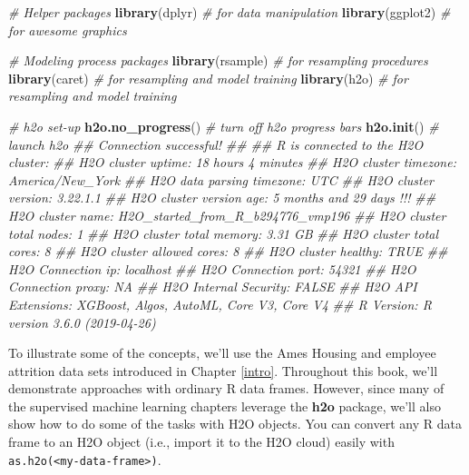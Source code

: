 \documentclass[]{krantz}
\makeatletter
\newenvironment{Shaded}{\begin{snugshade}}{\end{snugshade}}
\newcommand{\CommentTok}[1]{\textcolor[rgb]{0.37,0.37,0.37}{\textit{#1}}}
\newcommand{\KeywordTok}[1]{\textcolor[rgb]{0.27,0.27,0.27}{\textbf{#1}}}
\newcommand{\NormalTok}[1]{#1}
\newenvironment{kframe}{%
\medskip{}
\setlength{\fboxsep}{.8em}
 \def\at@end@of@kframe{}%
 \ifinner\ifhmode%
  \def\at@end@of@kframe{\end{minipage}}%
  \begin{minipage}{\columnwidth}%
 \fi\fi%
 \def\FrameCommand##1{\hskip\@totalleftmargin \hskip-\fboxsep
 \colorbox{shadecolor}{##1}\hskip-\fboxsep
     \hskip-\linewidth \hskip-\@totalleftmargin \hskip\columnwidth}%
 \MakeFramed {\advance\hsize-\width
   \@totalleftmargin\z@ \linewidth\hsize
   \@setminipage}}%
 {\par\unskip\endMakeFramed%
 \at@end@of@kframe}
\renewenvironment{Shaded}{\begin{kframe}}{\end{kframe}}
\makeatother
\begin{document}
\begin{Shaded}
\begin{Highlighting}[]
\CommentTok{# Helper packages}
\KeywordTok{library}\NormalTok{(dplyr)     }\CommentTok{# for data manipulation}
\KeywordTok{library}\NormalTok{(ggplot2)   }\CommentTok{# for awesome graphics}

\CommentTok{# Modeling process packages}
\KeywordTok{library}\NormalTok{(rsample)   }\CommentTok{# for resampling procedures}
\KeywordTok{library}\NormalTok{(caret)     }\CommentTok{# for resampling and model training}
\KeywordTok{library}\NormalTok{(h2o)       }\CommentTok{# for resampling and model training}

\CommentTok{# h2o set-up }
\KeywordTok{h2o.no_progress}\NormalTok{()  }\CommentTok{# turn off h2o progress bars}
\KeywordTok{h2o.init}\NormalTok{()         }\CommentTok{# launch h2o}
\CommentTok{##  Connection successful!}
\CommentTok{## }
\CommentTok{## R is connected to the H2O cluster: }
\CommentTok{##     H2O cluster uptime:         18 hours 4 minutes }
\CommentTok{##     H2O cluster timezone:       America/New_York }
\CommentTok{##     H2O data parsing timezone:  UTC }
\CommentTok{##     H2O cluster version:        3.22.1.1 }
\CommentTok{##     H2O cluster version age:    5 months and 29 days !!! }
\CommentTok{##     H2O cluster name:           H2O_started_from_R_b294776_vmp196 }
\CommentTok{##     H2O cluster total nodes:    1 }
\CommentTok{##     H2O cluster total memory:   3.31 GB }
\CommentTok{##     H2O cluster total cores:    8 }
\CommentTok{##     H2O cluster allowed cores:  8 }
\CommentTok{##     H2O cluster healthy:        TRUE }
\CommentTok{##     H2O Connection ip:          localhost }
\CommentTok{##     H2O Connection port:        54321 }
\CommentTok{##     H2O Connection proxy:       NA }
\CommentTok{##     H2O Internal Security:      FALSE }
\CommentTok{##     H2O API Extensions:         XGBoost, Algos, AutoML, Core V3, Core V4 }
\CommentTok{##     R Version:                  R version 3.6.0 (2019-04-26)}
\end{Highlighting}
\end{Shaded}

To illustrate some of the concepts, we'll use the Ames Housing and employee attrition data sets introduced in Chapter \ref{intro}. Throughout this book, we'll demonstrate approaches with ordinary R data frames. However, since many of the supervised machine learning chapters leverage the \textbf{h2o} package, we'll also show how to do some of the tasks with H2O objects. You can convert any R data frame to an H2O object (i.e., import it to the H2O cloud) easily with \texttt{as.h2o(\textless{}my-data-frame\textgreater{})}.
\end{document}
